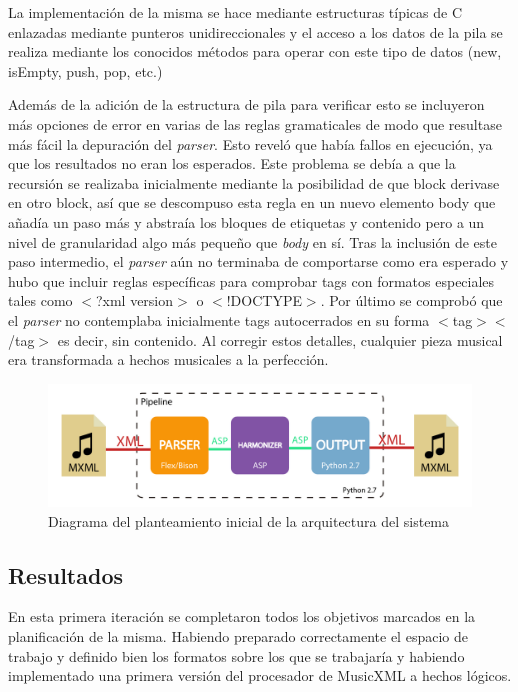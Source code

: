La implementación de la misma se hace mediante estructuras típicas de C enlazadas mediante punteros unidireccionales y el acceso a los datos de la pila se realiza mediante los conocidos métodos para operar con este tipo de datos (new, isEmpty, push, pop, etc.) 

Además de la adición de la estructura de pila para verificar esto se incluyeron más opciones de error en varias de las reglas gramaticales de modo que resultase más fácil la depuración del \textit{parser}. Esto reveló que había fallos en ejecución, ya que los resultados no eran los esperados. Este problema se debía a que la recursión se realizaba inicialmente mediante la posibilidad de que block derivase en otro block, así que se descompuso esta regla en un nuevo elemento body que añadía un paso más y abstraía los bloques de etiquetas y contenido pero a un nivel de granularidad algo más pequeño que \textit{body} en sí. Tras la inclusión de este paso intermedio, el \textit{parser} aún no terminaba de comportarse como era esperado y hubo que incluir reglas específicas para comprobar tags con formatos especiales tales como $<$?xml version$>$ o $<$!DOCTYPE$>$. Por último se comprobó que el \textit{parser} no contemplaba inicialmente tags autocerrados en su forma $<$tag$>$$<$/tag$>$ es decir, sin contenido. Al corregir estos detalles, cualquier pieza musical era transformada a hechos musicales a la perfección.

\begin{figure}
	\centering
	\includegraphics[width=0.8\linewidth]{imagenes/arquitectura_inicial.pdf}
	\caption{Diagrama del planteamiento inicial de la arquitectura del sistema}
	\label{fig:arquitectura_inicial}
\end{figure}

\subsection{Resultados}
\label{subsec:first_iteration_results}
En esta primera iteración se completaron todos los objetivos marcados en la planificación de la misma. Habiendo preparado correctamente el espacio de trabajo y definido bien los formatos sobre los que se trabajaría y habiendo implementado una primera versión del procesador de MusicXML a hechos lógicos.

